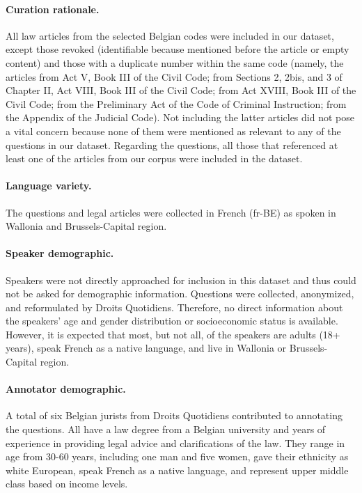 \documentclass[11pt]{article}
\begin{document}
\paragraph{Curation rationale.} 
All law articles from the selected Belgian codes were included in our dataset, except those revoked (identifiable because mentioned before the article or empty content) and those with a duplicate number within the same code (namely, the articles from Act V, Book III of the Civil Code; from Sections 2, 2bis, and 3 of Chapter II, Act VIII, Book III of the Civil Code; from Act XVIII, Book III of the Civil Code; from the Preliminary Act of the Code of Criminal Instruction; from the Appendix of the Judicial Code). Not including the latter articles did not pose a vital concern because none of them were mentioned as relevant to any of the questions in our dataset. Regarding the questions, all those that referenced at least one of the articles from our corpus were included in the dataset.

\paragraph{Language variety.}
The questions and legal articles were collected in French (fr-BE) as spoken in Wallonia and Brussels-Capital region.

\paragraph{Speaker demographic.}
Speakers were not directly approached for inclusion in this dataset and thus could not be asked for demographic information. Questions were collected, anonymized, and reformulated by Droits Quotidiens. Therefore, no direct information about the speakers’ age and gender distribution or socioeconomic status is available. However, it is expected that most, but not all, of the speakers are adults (18+ years), speak French as a native language, and live in Wallonia or Brussels-Capital region.

\paragraph{Annotator demographic.}
A total of six Belgian jurists from Droits Quotidiens contributed to annotating the questions. All have a law degree from a Belgian university and years of experience in providing legal advice and clarifications of the law. They range in age from 30-60 years, including one man and five women, gave their ethnicity as white European, speak French as a native language, and represent upper middle class based on income levels.
\end{document}
